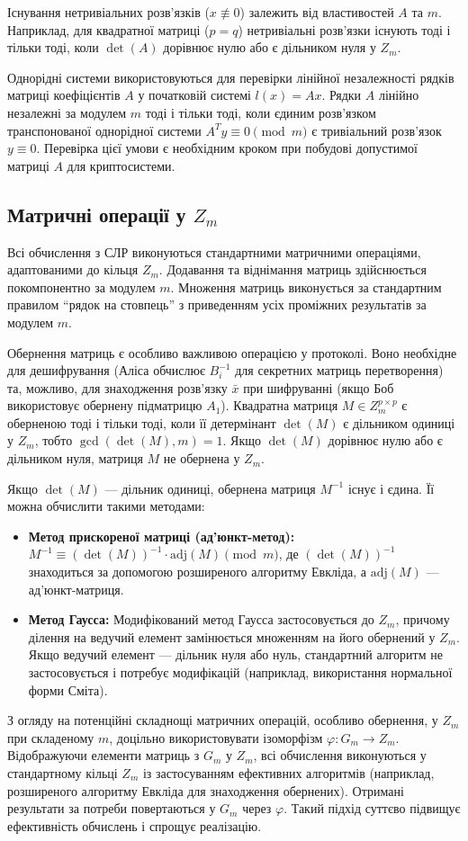 Існування нетривіальних розв'язків ($x \not\equiv 0$) залежить від властивостей $A$ та $m$.
Наприклад, для квадратної матриці ($p=q$) нетривіальні розв'язки існують тоді і тільки тоді, коли $\det(A)$ дорівнює нулю або є дільником нуля у $Z_m$.

Однорідні системи використовуються для перевірки лінійної незалежності рядків матриці коефіцієнтів $A$ у початковій системі $l(x)=Ax$.
Рядки $A$ лінійно незалежні за модулем $m$ тоді і тільки тоді, коли єдиним розв'язком транспонованої однорідної системи $A^T y \equiv 0 \pmod{m}$ є тривіальний розв'язок $y \equiv 0$.
Перевірка цієї умови є необхідним кроком при побудові допустимої матриці $A$ для криптосистеми.

\subsection{Матричні операції у $Z_m$}
\label{subsec:matrix_ops_zm}
Всі обчислення з СЛР виконуються стандартними матричними операціями, адаптованими до кільця $Z_m$.
Додавання та віднімання матриць здійснюється покомпонентно за модулем $m$.
Множення матриць виконується за стандартним правилом ``рядок на стовпець'' з приведенням усіх проміжних результатів за модулем $m$.

Обернення матриць є особливо важливою операцією у протоколі.
Воно необхідне для дешифрування (Аліса обчислює $B_i^{-1}$ для секретних матриць перетворення) та, можливо, для знаходження розв'язку $\bar{x}$ при шифруванні (якщо Боб використовує обернену підматрицю $A_1$).
Квадратна матриця $M \in Z_m^{p \times p}$ є оберненою тоді і тільки тоді, коли її детермінант $\det(M)$ є дільником одиниці у $Z_m$, тобто $\gcd(\det(M), m) = 1$.
Якщо $\det(M)$ дорівнює нулю або є дільником нуля, матриця $M$ не обернена у $Z_m$.

Якщо $\det(M)$ — дільник одиниці, обернена матриця $M^{-1}$ існує і єдина.
Її можна обчислити такими методами:
\begin{itemize}
    \item \textbf{Метод прискореної матриці (ад'юнкт-метод):} $M^{-1} \equiv (\det(M))^{-1} \cdot \mathrm{adj}(M) \pmod{m}$, де $(\det(M))^{-1}$ знаходиться за допомогою розширеного алгоритму Евкліда, а $\mathrm{adj}(M)$ — ад'юнкт-матриця.
    \item \textbf{Метод Гаусса:} Модифікований метод Гаусса застосовується до $Z_m$, причому ділення на ведучий елемент замінюється множенням на його обернений у $Z_m$.
    Якщо ведучий елемент — дільник нуля або нуль, стандартний алгоритм не застосовується і потребує модифікацій (наприклад, використання нормальної форми Сміта).
\end{itemize}
З огляду на потенційні складнощі матричних операцій, особливо обернення, у $Z_m$ при складеному $m$, доцільно використовувати ізоморфізм $\varphi: G_m \to Z_m$.
Відображуючи елементи матриць з $G_m$ у $Z_m$, всі обчислення виконуються у стандартному кільці $Z_m$ із застосуванням ефективних алгоритмів (наприклад, розширеного алгоритму Евкліда для знаходження обернених).
Отримані результати за потреби повертаються у $G_m$ через $\varphi$.
Такий підхід суттєво підвищує ефективність обчислень і спрощує реалізацію.


